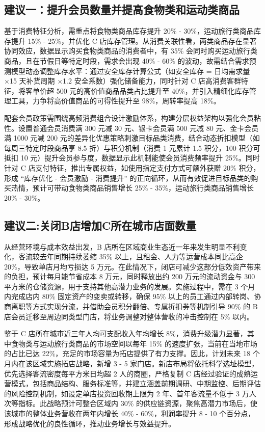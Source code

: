 \documentclass[withoutpreface,bwprint]{cumcmthesis}
\begin{document}
\subsection{建议一：提升会员数量并提高食物类和运动类商品}
基于消费特征分析，需重点将食物类商品库存提升 20\% - 30\%，运动旅行类商品库存提升 15\% - 25\%，并优化 C 店库存管理。从消费关联性看，两类商品存在显著协同效应，数据显示购买食物类商品的消费者中，有 35\% 会同时购买运动旅行类商品，且在节假日等特定时段，需求会出现 40\% - 60\% 的波动，故需结合需求预测模型动态调整库存水平：通过安全库存计算公式（如安全库存 = 日均需求量 ×15 天补货周期 ×1.2 安全系数）强化储备能力，同时针对 C 店高消费客群特征，将客单价超 500 元的高价值商品品类占比提升至 40\%，并引入精细化库存管理工具，力争将高价值商品的可得性提升至 98\%，周转率提高 18\%。
\par 配套会员政策需围绕高频消费组合设计激励体系，构建分层权益架构以强化会员粘性。设置普通会员消费满 300 元减 30 元、银卡会员满 500 元减 80 元、金卡会员满 1000 元减 200 元的差异化优惠策略刺激目标品类消费，结合动态折扣模型（如每周三特定时段商品享 8.5 折）与积分机制（消费 1 元累计 1.5 积分，100 积分可抵扣 10 元）提升会员参与度，数据显示此机制能使会员消费频率提升 25\%。同时针对 C 店支付特征，推出专属权益，如使用指定支付方式可额外获赠 20\% 积分，形成 “库存优化 - 会员激励 - 消费提升” 的正向循环，从而有效促进目标品类的购买热情，预计可带动食物类商品销售增长 25\% - 35\%，运动旅行类商品销售增长 20\% - 30\%。

\subsection{建议二:关闭B店增加C所在城市店面数量}
从经营环境与成本效益出发，B 店所在区域商业生态近一年来发生明显不利变化，客流较去年同期持续萎缩 35\% 以上，且租金、人力等运营成本同比高企 20\%，导致单店月均亏损达 5 万元。在此情况下，闭店可减少这部分低效资产带来的负担，预计每月能节省成本 8 万元，同时释放出约 200 万元的流动资金与 300 平方米的仓储资源，用于支持其他高潜力业务的发展。实施过程中，需在 3 个月内完成店内 80\% 固定资产的变卖或转移，确保 95\% 以上的员工通过内部转岗、协商离职等方式实现分流，并借助会员积分翻倍、专属折扣券等机制引导 90\% 的 B 店会员迁移至周边同类型门店，将业务调整对整体营收的冲击控制在 5\% 以内。
\par 鉴于 C 店所在城市近三年人均可支配收入年均增长 8\%，消费升级潜力显著，其中食物类与运动旅行类商品的市场空间以每年 15\% 的速度扩张，当前在当地市场的占比已达 22\%，充足的市场容量为拓店提供了有力支撑。因此，计划未来 18 个月内在该区域实施拓店战略，新增 3 - 5 家门店。新店布局将依托科学选址模型，优先选择客流密度每平方米日均超 2 人的商圈，严格复制 C 店经过验证的成熟运营模式，包括商品结构、服务标准等，并建立涵盖前期调研、中期监控、后期评估的风险控制机制，如设定单店投资回收期上限为 2 年、首年客流量不低于 3 万人次等指标。此战略预计可整合区域内 30\% 的供应链资源，聚焦高潜力市场后，使该城市的整体业务营收在两年内增长 40\% - 60\%，利润率提升 8 - 10 个百分点，形成战略优化的良性循环，推动业务增长与效益提升。
\end{document}
